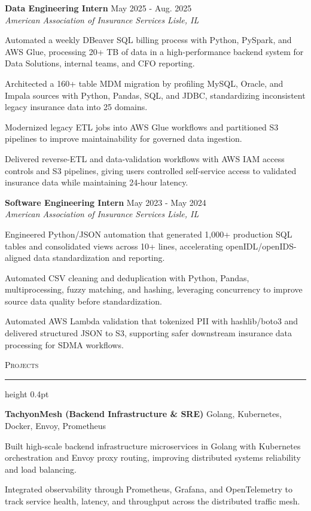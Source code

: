 \documentclass[letterpaper,11pt]{article}
\newcommand{\resumesection}[1]{%
  \par\vspace{2pt}%
  {\large\scshape #1}\par\vspace{2pt}%
  \hrule height 0.4pt\vspace{2pt}%
}
\newcommand{\resumeSubheading}[4]{
  \textbf{#1} \hfill #2\\
  \textit{#3} \hfill \textit{#4}
}
\newcommand{\projectHeading}[2]{
  \textbf{#1} \hfill #2
}
\begin{document}
\resumeSubheading
{Data Engineering Intern}{May 2025 - Aug. 2025}
{American Association of Insurance Services}{Lisle, IL}
\begin{tightitemize}
  \item Automated a weekly DBeaver SQL billing process with Python, PySpark, and AWS Glue, processing 20+ TB of data in a high-performance backend system for Data Solutions, internal teams, and CFO reporting.
  \item Architected a 160+ table MDM migration by profiling MySQL, Oracle, and Impala sources with Python, Pandas, SQL, and JDBC, standardizing inconsistent legacy insurance data into 25 domains.
  \item Modernized legacy ETL jobs into AWS Glue workflows and partitioned S3 pipelines to improve maintainability for governed data ingestion.
  \item Delivered reverse-ETL and data-validation workflows with AWS IAM access controls and S3 pipelines, giving users controlled self-service access to validated insurance data while maintaining 24-hour latency.
\end{tightitemize}

\resumeSubheading
{Software Engineering Intern}{May 2023 - May 2024}
{American Association of Insurance Services}{Lisle, IL}
\begin{tightitemize}
  \item Engineered Python/JSON automation that generated 1,000+ production SQL tables and consolidated views across 10+ lines, accelerating openIDL/openIDS-aligned data standardization and reporting.
  \item Automated CSV cleaning and deduplication with Python, Pandas, multiprocessing, fuzzy matching, and hashing, leveraging concurrency to improve source data quality before standardization.
  \item Automated AWS Lambda validation that tokenized PII with hashlib/boto3 and delivered structured JSON to S3, supporting safer downstream insurance data processing for SDMA workflows.
\end{tightitemize}

\resumesection{Projects}
\projectHeading{TachyonMesh (Backend Infrastructure \& SRE)}{Golang, Kubernetes, Docker, Envoy, Prometheus}
\begin{tightitemize}
  \item Built high-scale backend infrastructure microservices in Golang with Kubernetes orchestration and Envoy proxy routing, improving distributed systems reliability and load balancing.
  \item Integrated observability through Prometheus, Grafana, and OpenTelemetry to track service health, latency, and throughput across the distributed traffic mesh.
\end{tightitemize}
\end{document}
